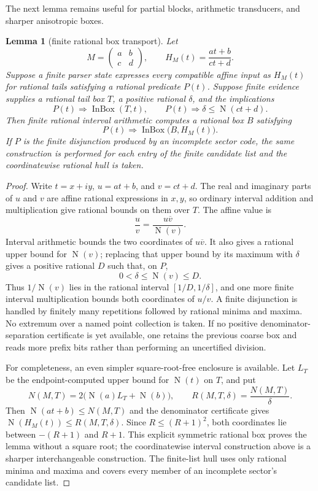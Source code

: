 \documentclass[10pt]{article}
\newtheorem{lemma}[theorem]{Lemma}
\theoremstyle{definition}
\theoremstyle{remark}
\newcommand{\Norm}{\operatorname{N}}
\newcommand{\mat}[4]{\begin{pmatrix}#1&#2\\#3&#4\end{pmatrix}}
\begin{document}
The next lemma remains useful for partial blocks, arithmetic transducers, and sharper anisotropic boxes.

\begin{lemma}[finite rational box transport]\label{lem:box-transport}
Let
\[
 M=\mat{a}{b}{c}{d},
 \qquad
 H_M(t)=\frac{at+b}{ct+d}.
\]
Suppose a finite parser state expresses every compatible affine input as $H_M(t)$ for rational tails satisfying a rational predicate $P(t)$.  Suppose finite evidence supplies a rational tail box $T$, a positive rational $\delta$, and the implications
\[
 P(t)\Longrightarrow\operatorname{InBox}(T,t),
 \qquad
 P(t)\Longrightarrow \delta\le\Norm(ct+d).
\]
Then finite rational interval arithmetic computes a rational box $B$ satisfying
\[
 P(t)\Longrightarrow
 \operatorname{InBox}\bigl(B,H_M(t)\bigr).
\]
If $P$ is the finite disjunction produced by an incomplete sector code, the same construction is performed for each entry of the finite candidate list and the coordinatewise rational hull is taken.
\end{lemma}

\begin{proof}
Write $t=x+iy$, $u=at+b$, and $v=ct+d$.  The real and imaginary parts of $u$ and $v$ are affine rational expressions in $x,y$, so ordinary interval addition and multiplication give rational bounds on them over $T$.  The affine value is
\[
 \frac{u}{v}=\frac{u\overline v}{\Norm(v)}.
\]
Interval arithmetic bounds the two coordinates of $u\overline v$.  It also gives a rational upper bound for $\Norm(v)$; replacing that upper bound by its maximum with $\delta$ gives a positive rational $D$ such that, on $P$,
\[
 0<\delta\le\Norm(v)\le D.
\]
Thus $1/\Norm(v)$ lies in the rational interval $[1/D,1/\delta]$, and one more finite interval multiplication bounds both coordinates of $u/v$.  A finite disjunction is handled by finitely many repetitions followed by rational minima and maxima.  No extremum over a named point collection is taken.  If no positive denominator-separation certificate is yet available, one retains the previous coarse box and reads more prefix bits rather than performing an uncertified division.

For completeness, an even simpler square-root-free enclosure is available.
Let $L_T$ be the endpoint-computed upper bound
for $\Norm(t)$ on $T$, and put
\[
 N(M,T)=2\bigl(\Norm(a)L_T+\Norm(b)\bigr),\qquad
 R(M,T,\delta)=\frac{N(M,T)}{\delta}.
\]
Then $\Norm(at+b)\le N(M,T)$ and the denominator certificate gives
$\Norm(H_M(t))\le R(M,T,\delta)$.  Since
$R\le(R+1)^2$, both coordinates lie between $-(R+1)$ and $R+1$.
This explicit symmetric rational box proves the lemma without a square root;
the coordinatewise interval construction above is a sharper interchangeable
construction.  The finite-list hull uses only rational minima and maxima and
covers every member of an incomplete sector's candidate list.
\end{proof}
\end{document}
